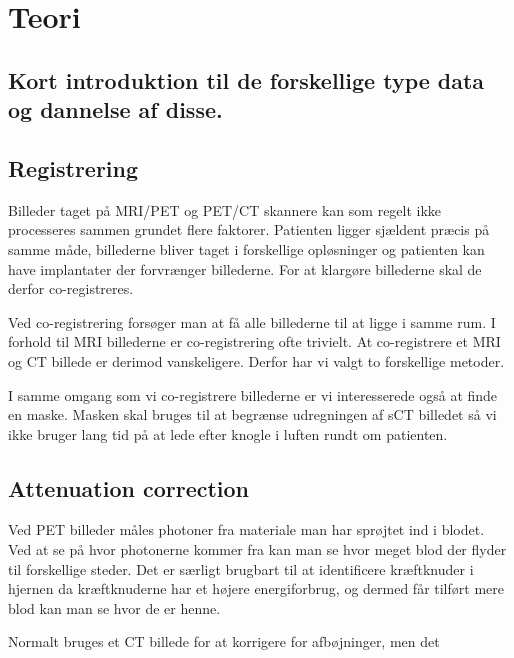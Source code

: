 \section{Teori}
\subsection{Kort introduktion til de forskellige type data og dannelse af disse.}


\subsection{Registrering}


Billeder taget på MRI/PET og PET/CT skannere kan som regelt ikke processeres sammen
grundet flere faktorer. Patienten ligger sjældent præcis på samme måde, billederne
bliver taget i forskellige opløsninger og patienten kan have implantater der
forvrænger billederne. For at klargøre billederne skal de derfor co-registreres.

Ved co-registrering forsøger man at få alle billederne til at ligge i samme rum.
I forhold til MRI billederne er co-registrering ofte trivielt. At co-registrere
et MRI og CT billede er derimod vanskeligere. Derfor har vi valgt to forskellige
metoder.

I samme omgang som vi co-registrere billederne er vi interesserede også at finde
en maske. Masken skal bruges til at begrænse udregningen af sCT billedet så vi
ikke bruger lang tid på at lede efter knogle i luften rundt om patienten.

\subsection{Attenuation correction}
Ved PET billeder måles photoner fra materiale man har sprøjtet ind i blodet. Ved
at se på hvor photonerne kommer fra kan man se hvor meget blod der flyder til
forskellige steder. Det er særligt brugbart til at identificere kræftknuder i
hjernen da kræftknuderne har et højere energiforbrug, og dermed får tilført
mere blod kan man se hvor de er henne.

Normalt bruges et CT billede for at korrigere for afbøjninger, men det  


